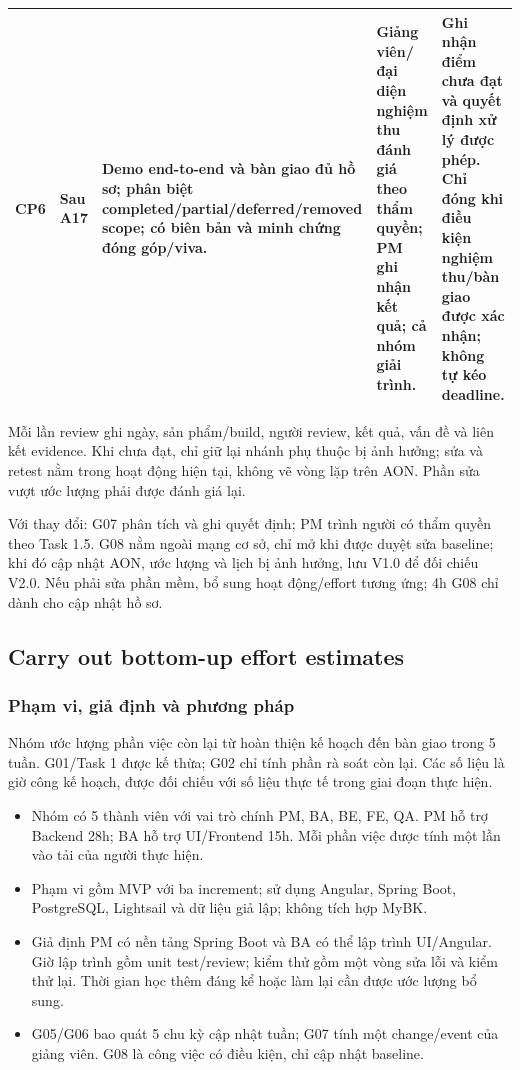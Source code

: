 \documentclass{article}
\begin{document}
\begin{landscape}
\begin{table}[H]
\begin{tabularx}{\linewidth}{|p{1cm}|p{3.1cm}|>{\raggedright\arraybackslash}X|p{5cm}|p{5.5cm}|}
CP6 & Sau A17 & Demo end-to-end và bàn giao đủ hồ sơ; phân biệt completed/partial/deferred/removed scope; có biên bản và minh chứng đóng góp/viva. & Giảng viên/đại diện nghiệm thu đánh giá theo thẩm quyền; PM ghi nhận kết quả; cả nhóm giải trình. & Ghi nhận điểm chưa đạt và quyết định xử lý được phép. Chỉ đóng khi điều kiện nghiệm thu/bàn giao được xác nhận; không tự kéo deadline. \\ \hline
\end{tabularx}
\end{table}

\noindent Mỗi lần review ghi ngày, sản phẩm/build, người review, kết quả, vấn đề và liên kết evidence. Khi chưa đạt, chỉ giữ lại nhánh phụ thuộc bị ảnh hưởng; sửa và retest nằm trong hoạt động hiện tại, không vẽ vòng lặp trên AON. Phần sửa vượt ước lượng phải được đánh giá lại.

\medskip
\noindent Với thay đổi: G07 phân tích và ghi quyết định; PM trình người có thẩm quyền theo Task 1.5. G08 nằm ngoài mạng cơ sở, chỉ mở khi được duyệt sửa baseline; khi đó cập nhật AON, ước lượng và lịch bị ảnh hưởng, lưu V1.0 để đối chiếu V2.0. Nếu phải sửa phần mềm, bổ sung hoạt động/effort tương ứng; 4h G08 chỉ dành cho cập nhật hồ sơ.
\end{landscape}
\restoregeometry

\clearpage
{}
\subsection{Carry out bottom-up effort estimates}
\subsubsection{Phạm vi, giả định và phương pháp}
Nhóm ước lượng phần việc còn lại từ hoàn thiện kế hoạch đến bàn giao trong 5 tuần. G01/Task 1 được kế thừa; G02 chỉ tính phần rà soát còn lại. Các số liệu là giờ công kế hoạch, được đối chiếu với số liệu thực tế trong giai đoạn thực hiện.
\begin{itemize}[leftmargin=*,nosep]
\item Nhóm có 5 thành viên với vai trò chính PM, BA, BE, FE, QA. PM hỗ trợ Backend 28h; BA hỗ trợ UI/Frontend 15h. Mỗi phần việc được tính một lần vào tải của người thực hiện.
\item Phạm vi gồm MVP với ba increment; sử dụng Angular, Spring Boot, PostgreSQL, Lightsail và dữ liệu giả lập; không tích hợp MyBK.
\item Giả định PM có nền tảng Spring Boot và BA có thể lập trình UI/Angular. Giờ lập trình gồm unit test/review; kiểm thử gồm một vòng sửa lỗi và kiểm thử lại. Thời gian học thêm đáng kể hoặc làm lại cần được ước lượng bổ sung.
\item G05/G06 bao quát 5 chu kỳ cập nhật tuần; G07 tính một change/event của giảng viên. G08 là công việc có điều kiện, chỉ cập nhật baseline.
\end{itemize}
\end{document}
